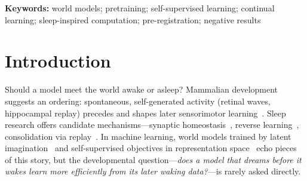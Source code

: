 \documentclass[11pt,a4paper]{article}
\newcommand{\som}{\textsc{Somnium}}
\begin{document}
\begin{abstract}
post-birth runs, including an instrument unit-error episode whose flawed matrix is retained as the figure's lower bound. The same boundary holds on the protection side: under a mirrored-observation conflict, forgetting is constructible ($1.4$--$1.7\times$ representational degradation, semantics intact) and is halved by replaying old data but not by dream pretraining; and under observation noise the uncertainty head's coverage collapses ($0.19$--$0.61$) with a terminal-event hole that blind-spot-weighted dream replay fails to repair (a registered instrument defect and a seed-split null close that line). Finally, the external control this line of work invites: a parameter-matched autoregressive transformer, trained lockstep on bit-identical batches, dominates both teacher-forced one-step (${\sim}25$pp) and 16-step open-loop ($51$--$82$pp) observation prediction---leaving \som{} one registered residue (slower error compounding, $4.4$--$4.9\times$ vs.\ $5.8$--$6.8\times$) and no open claim on this scale's observation-prediction bench. All hypotheses, thresholds, corrections, and outcomes---including the retraction of our own earlier ``expressivity ceiling'' claim and, now, of the non-stationary closure itself---are logged in a public run registry. A theory that can be killed is a theory that can evolve.
\end{abstract}

\vspace{2pt}
\noindent\textbf{Keywords:} world models; pretraining; self-supervised learning; continual learning; sleep-inspired computation; pre-registration; negative results

\section{Introduction}\label{sec:intro}

Should a model meet the world awake or asleep? Mammalian development suggests an ordering: spontaneous, self-generated activity (retinal waves, hippocampal replay) precedes and shapes later sensorimotor learning~\cite{blankenship2009,wilson1994}. Sleep research offers candidate mechanisms---synaptic homeostasis~\cite{tononi2014}, reverse learning~\cite{crick1983}, consolidation via replay~\cite{rasch2013}. In machine learning, world models trained by latent imagination~\cite{hafner2023} and self-supervised objectives in representation space~\cite{lecun2022,assran2023} echo pieces of this story, but the developmental question---\emph{does a model that dreams before it wakes learn more efficiently from its later waking data?}---is rarely asked directly.
\end{document}
